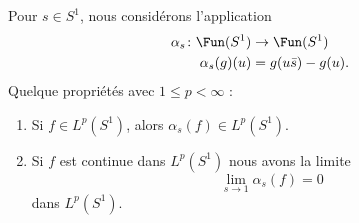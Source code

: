\begin{lemma}
    Pour \( s\in S^1\), nous considérons l'application
    \begin{equation}
        \begin{aligned}
            \alpha_s\colon \Fun(S^1)&\to \Fun(S^1) \\
            \alpha_s(g)(u)&=g(u\bar s)-g(u).
        \end{aligned}
    \end{equation}
    Quelque propriétés avec \( 1\leq p<\infty\) :
    \begin{enumerate}
        \item
            Si \( f\in L^p(S^1)\), alors \( \alpha_s(f)\in L^p(S^1)\).
        \item
            Si \( f\) est continue dans \( L^p(S^1)\) nous avons la limite
            \begin{equation}
                \lim_{s\to 1} \alpha_s(f)=0
            \end{equation}
            dans \( L^p(S^1)\).
    \end{enumerate}
\end{lemma}

